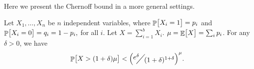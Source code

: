 Here we present the Chernoff bound in a more general settings.

\begin{fragment}{}
    \begin{theorem}
        Let $X_1, \ldots, X_n$ be $n$ independent variables, where
        \begin{math}
            \Prob{ \bigl. X_i = 1 } =p_i
        \end{math}
        and
        \begin{math}
            \Prob{ \bigl. X_i = 0 } =q_i = 1-p_i,
        \end{math}
        for all $i$.  Let $X = \sum_{i=1}^{b} X_i$.
        $\mu = \mathop{\mathbb{E}}\!\left[ {\bigl. X} \right] = \sum_i p_i$.  For any $\delta > 0$, we
        have
        \begin{equation*}
            \Prob{ \bigl. X > (1+\delta)\mu } < \pth{
               \NiceFrac{e^\delta}{(1+\delta)^{1+\delta}}}^\mu.
        \end{equation*}


    \end{theorem}%

\end{fragment}

